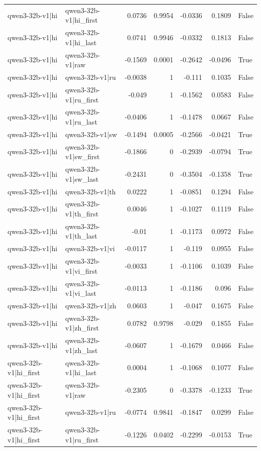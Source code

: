 \begin{table}
\begin{tabular}{l l r r r r l}
qwen3-32b-v1|hi & qwen3-32b-v1|hi_first & 0.0736 & 0.9954 & -0.0336 & 0.1809 & False \\
qwen3-32b-v1|hi & qwen3-32b-v1|hi_last & 0.0741 & 0.9946 & -0.0332 & 0.1813 & False \\
qwen3-32b-v1|hi & qwen3-32b-v1|raw & -0.1569 & 0.0001 & -0.2642 & -0.0496 & True \\
qwen3-32b-v1|hi & qwen3-32b-v1|ru & -0.0038 & 1 & -0.111 & 0.1035 & False \\
qwen3-32b-v1|hi & qwen3-32b-v1|ru_first & -0.049 & 1 & -0.1562 & 0.0583 & False \\
qwen3-32b-v1|hi & qwen3-32b-v1|ru_last & -0.0406 & 1 & -0.1478 & 0.0667 & False \\
qwen3-32b-v1|hi & qwen3-32b-v1|sw & -0.1494 & 0.0005 & -0.2566 & -0.0421 & True \\
qwen3-32b-v1|hi & qwen3-32b-v1|sw_first & -0.1866 & 0 & -0.2939 & -0.0794 & True \\
qwen3-32b-v1|hi & qwen3-32b-v1|sw_last & -0.2431 & 0 & -0.3504 & -0.1358 & True \\
qwen3-32b-v1|hi & qwen3-32b-v1|th & 0.0222 & 1 & -0.0851 & 0.1294 & False \\
qwen3-32b-v1|hi & qwen3-32b-v1|th_first & 0.0046 & 1 & -0.1027 & 0.1119 & False \\
qwen3-32b-v1|hi & qwen3-32b-v1|th_last & -0.01 & 1 & -0.1173 & 0.0972 & False \\
qwen3-32b-v1|hi & qwen3-32b-v1|vi & -0.0117 & 1 & -0.119 & 0.0955 & False \\
qwen3-32b-v1|hi & qwen3-32b-v1|vi_first & -0.0033 & 1 & -0.1106 & 0.1039 & False \\
qwen3-32b-v1|hi & qwen3-32b-v1|vi_last & -0.0113 & 1 & -0.1186 & 0.096 & False \\
qwen3-32b-v1|hi & qwen3-32b-v1|zh & 0.0603 & 1 & -0.047 & 0.1675 & False \\
qwen3-32b-v1|hi & qwen3-32b-v1|zh_first & 0.0782 & 0.9798 & -0.029 & 0.1855 & False \\
qwen3-32b-v1|hi & qwen3-32b-v1|zh_last & -0.0607 & 1 & -0.1679 & 0.0466 & False \\
qwen3-32b-v1|hi_first & qwen3-32b-v1|hi_last & 0.0004 & 1 & -0.1068 & 0.1077 & False \\
qwen3-32b-v1|hi_first & qwen3-32b-v1|raw & -0.2305 & 0 & -0.3378 & -0.1233 & True \\
qwen3-32b-v1|hi_first & qwen3-32b-v1|ru & -0.0774 & 0.9841 & -0.1847 & 0.0299 & False \\
qwen3-32b-v1|hi_first & qwen3-32b-v1|ru_first & -0.1226 & 0.0402 & -0.2299 & -0.0153 & True \\

\end{tabular}
\end{table}
